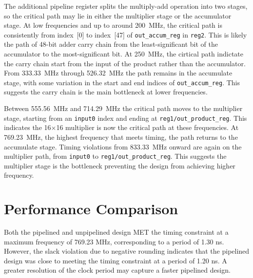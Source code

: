 \documentclass[a4paper,11pt]{article}
\begin{document}
The additional pipeline register splits the multiply-add operation into two stages, so the critical path may lie in either the multiplier stage or the accumulator stage. At low frequencies and up to around 200~MHz, the critical path is consistently from index~[0] to index~[47] of \texttt{out\_accum\_reg} in \texttt{reg2}. This is likely the path of 48-bit adder carry chain from the least-significant bit of the accumulator to the most-significant bit. At 250~MHz, the cirtical path indictate the carry chain start from the input of the product rather than the accumulator. From 333.33~MHz through 526.32~MHz the path remains in the accumulate stage, with some variation in the start and end indices of \texttt{out\_accum\_reg}. This suggests the carry chain is the main bottleneck at lower frequencies. 

Between 555.56~MHz and 714.29~MHz the critical path moves to the multiplier stage, starting from an \texttt{input0} index and ending at \texttt{reg1/out\_product\_reg}. This indicates the 16$\times$16 multiplier is now the critical path at these frequencies. At 769.23~MHz, the highest frequency that meets timing, the path returns to the accumulate stage. Timing violations from 833.33~MHz onward are again on the multiplier path, from \texttt{input0} to \texttt{reg1/out\_product\_reg}. This suggests the multiplier stage is the bottleneck preventing the design from achieving higher frequency.

\section{Performance Comparison}

Both the pipelined and unpipelined design MET the timing constraint at a maximum frequency of 769.23 MHz, corresponding to a period of 1.30 ns. However, the slack violation due to negative rounding indicates that the pipelined design was close to meeting the timing constraint at a period of 1.20 ns. A greater resolution of the clock period may capture a faster pipelined design. 
\end{document}
